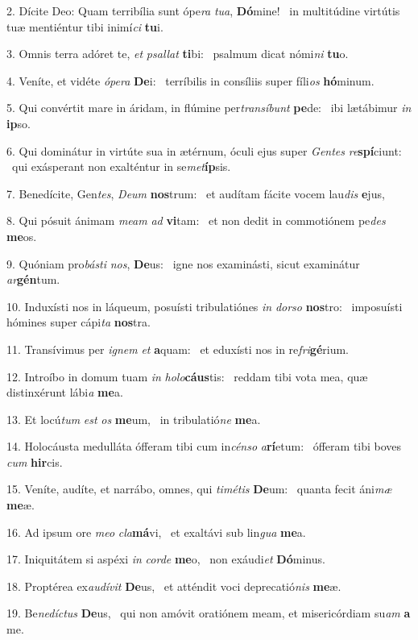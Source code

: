 2. Dícite Deo: Quam terribília sunt ópe\textit{ra} \textit{tu}\textit{a}, \textbf{Dó}mine! \ast\  in multitúdine virtútis tuæ mentiéntur tibi inimí\textit{ci} \textbf{tu}i.\

3. Omnis terra adóret te, \textit{et} \textit{psal}\textit{lat} \textbf{ti}bi: \ast\  psalmum dicat nómi\textit{ni} \textbf{tu}o.\

4. Veníte, et vidéte \textit{ó}\textit{pe}\textit{ra} \textbf{De}i: \ast\  terríbilis in consíliis super fíli\textit{os} \textbf{hó}minum.\

5. Qui convértit mare in áridam, in flúmine per\textit{trans}\textit{í}\textit{bunt} \textbf{pe}de: \ast\  ibi lætábimur \textit{in} \textbf{ip}so.\

6. Qui dominátur in virtúte sua in ætérnum, óculi ejus super \textit{Gen}\textit{tes} \textit{re}\textbf{spí}ciunt: \ast\  qui exásperant non exalténtur in se\textit{met}\textbf{íp}sis.\

7. Benedícite, Gen\textit{tes}, \textit{De}\textit{um} \textbf{nos}trum: \ast\  et audítam fácite vocem lau\textit{dis} \textbf{e}jus,\

8. Qui pósuit ánimam \textit{me}\textit{am} \textit{ad} \textbf{vi}tam: \ast\  et non dedit in commotiónem pe\textit{des} \textbf{me}os.\

9. Quóniam pro\textit{bás}\textit{ti} \textit{nos}, \textbf{De}us: \ast\  igne nos examinásti, sicut examinátur \textit{ar}\textbf{gén}tum.\

10. Induxísti nos in láqueum, posuísti tribulatiónes \textit{in} \textit{dor}\textit{so} \textbf{nos}tro: \ast\  imposuísti hómines super cápi\textit{ta} \textbf{nos}tra.\

11. Transívimus per \textit{i}\textit{gnem} \textit{et} \textbf{a}quam: \ast\  et eduxísti nos in re\textit{fri}\textbf{gé}rium.\

12. Introíbo in domum tuam \textit{in} \textit{ho}\textit{lo}\textbf{cáus}tis: \ast\  reddam tibi vota mea, quæ distinxérunt lábi\textit{a} \textbf{me}a.\

13. Et locú\textit{tum} \textit{est} \textit{os} \textbf{me}um, \ast\  in tribulatió\textit{ne} \textbf{me}a.\

14. Holocáusta medulláta ófferam tibi cum in\textit{cén}\textit{so} \textit{a}\textbf{rí}etum: \ast\  ófferam tibi boves \textit{cum} \textbf{hir}cis.\

15. Veníte, audíte, et narrábo, omnes, qui \textit{ti}\textit{mé}\textit{tis} \textbf{De}um: \ast\  quanta fecit áni\textit{mæ} \textbf{me}æ.\

16. Ad ipsum ore \textit{me}\textit{o} \textit{cla}\textbf{má}vi, \ast\  et exaltávi sub lin\textit{gua} \textbf{me}a.\

17. Iniquitátem si aspéxi \textit{in} \textit{cor}\textit{de} \textbf{me}o, \ast\  non exáudi\textit{et} \textbf{Dó}minus.\

18. Proptérea ex\textit{au}\textit{dí}\textit{vit} \textbf{De}us, \ast\  et atténdit voci deprecatió\textit{nis} \textbf{me}æ.\

19. Be\textit{ne}\textit{díc}\textit{tus} \textbf{De}us, \ast\  qui non amóvit oratiónem meam, et misericórdiam su\textit{am} \textbf{a} me.\

